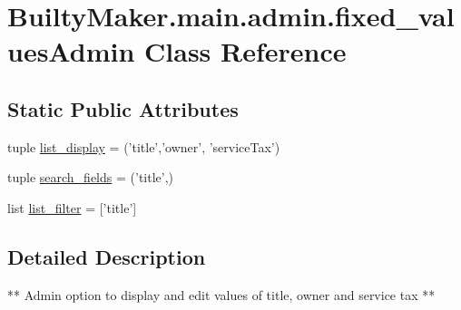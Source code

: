 \hypertarget{classBuiltyMaker_1_1main_1_1admin_1_1fixed__valuesAdmin}{\section{\-Builty\-Maker.\-main.\-admin.\-fixed\-\_\-values\-Admin \-Class \-Reference}
\label{classBuiltyMaker_1_1main_1_1admin_1_1fixed__valuesAdmin}
}
\subsection*{\-Static \-Public \-Attributes}
\begin{DoxyCompactItemize}
\item 
tuple \hyperlink{classBuiltyMaker_1_1main_1_1admin_1_1fixed__valuesAdmin_a5fb4e268d2a80c96ea5b933c5ec17531}{list\-\_\-display} = ('title','owner', 'service\-Tax')
\item 
tuple \hyperlink{classBuiltyMaker_1_1main_1_1admin_1_1fixed__valuesAdmin_ae83a8685d5f6890591611fe68eba5238}{search\-\_\-fields} = ('title',)
\item 
list \hyperlink{classBuiltyMaker_1_1main_1_1admin_1_1fixed__valuesAdmin_a98e84521b3447583946e42c94983b812}{list\-\_\-filter} = \mbox{[}'title'\mbox{]}
\end{DoxyCompactItemize}


\subsection{\-Detailed \-Description}
\begin{DoxyVerb}
    ** Admin option to display and edit values of title, owner
       and service tax **
\end{DoxyVerb}
 


